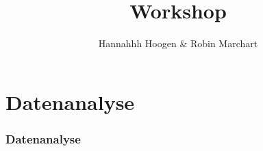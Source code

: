 \documentclass[aspectratio=169]{beamer}
\title{Workshop }
\author{Hannahhh Hoogen \& Robin Marchart}
\institute{TUM Kolleg Wissenschaftstag}
\begin{document}
    \begin{frame}
        
    \end{frame}
    \maketitle
    \section{Datenanalyse}
    \begin{frame}
        \frametitle{Datenanalyse}
        
    
    \end{frame}
\end{document}
